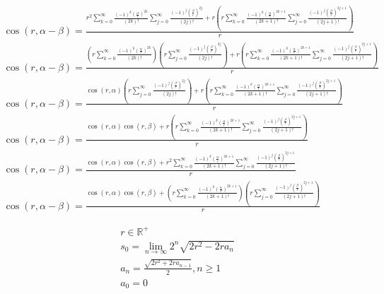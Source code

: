 \documentclass[a4paper,12pt]{report}
\begin{document}
\begin{landscape}
{\begin{gather}
\cos(r,\alpha - \beta) = \frac{r^2 \sum \limits_{k=0}^{\infty} \frac{(-1)^k \left(\frac{\alpha}{r}\right)^{2k}}{(2k)!} \sum \limits_{j=0}^{\infty} \frac{(-1)^j \left(\frac{\beta}{r}\right)^{2j}}{(2j)!} + r \left(r \sum \limits_{k=0}^{\infty} \frac{(-1)^k \left(\frac{\alpha}{r}\right)^{2k+1}}{(2k+1)!} \sum \limits_{j=0}^{\infty} \frac{(-1)^j \left(\frac{\beta}{r}\right)^{2j+1}}{(2j+1)!}\right)}{r} \\
\cos(r,\alpha - \beta) = \frac{\left(r \sum \limits_{k=0}^{\infty} \frac{(-1)^k \left(\frac{\alpha}{r}\right)^{2k}}{(2k)!}\right) \left(r \sum \limits_{j=0}^{\infty} \frac{(-1)^j \left(\frac{\beta}{r}\right)^{2j}}{(2j)!}\right) + r \left(r \sum \limits_{k=0}^{\infty} \frac{(-1)^k \left(\frac{\alpha}{r}\right)^{2k+1}}{(2k+1)!} \sum \limits_{j=0}^{\infty} \frac{(-1)^j \left(\frac{\beta}{r}\right)^{2j+1}}{(2j+1)!}\right)}{r} \\
\cos(r,\alpha - \beta) = \frac{\cos(r,\alpha) \left(r \sum \limits_{j=0}^{\infty} \frac{(-1)^j \left(\frac{\beta}{r}\right)^{2j}}{(2j)!}\right) + r \left(r \sum \limits_{k=0}^{\infty} \frac{(-1)^k \left(\frac{\alpha}{r}\right)^{2k+1}}{(2k+1)!} \sum \limits_{j=0}^{\infty} \frac{(-1)^j \left(\frac{\beta}{r}\right)^{2j+1}}{(2j+1)!}\right)}{r} \\
\cos(r,\alpha - \beta) = \frac{\cos(r,\alpha) \cos(r,\beta) + r \left(r \sum \limits_{k=0}^{\infty} \frac{(-1)^k \left(\frac{\alpha}{r}\right)^{2k+1}}{(2k+1)!} \sum \limits_{j=0}^{\infty} \frac{(-1)^j \left(\frac{\beta}{r}\right)^{2j+1}}{(2j+1)!}\right)}{r} \\
\cos(r,\alpha - \beta) = \frac{\cos(r,\alpha) \cos(r,\beta) + r^2 \sum \limits_{k=0}^{\infty} \frac{(-1)^k \left(\frac{\alpha}{r}\right)^{2k+1}}{(2k+1)!} \sum \limits_{j=0}^{\infty} \frac{(-1)^j \left(\frac{\beta}{r}\right)^{2j+1}}{(2j+1)!}}{r} \\
\cos(r,\alpha - \beta) = \frac{\cos(r,\alpha) \cos(r,\beta) + \left(r \sum \limits_{k=0}^{\infty} \frac{(-1)^k \left(\frac{\alpha}{r}\right)^{2k+1}}{(2k+1)!}\right) \left(r \sum \limits_{j=0}^{\infty} \frac{(-1)^j \left(\frac{\beta}{r}\right)^{2j+1}}{(2j+1)!}\right)}{r} \label{eq:cos_subtraction_formula}
\end{gather}
}
\end{landscape}
\begin{subequations}
\begin{gather}
r \in \mathbb{R}^+ \\
s_0 = \lim \limits_{n \to \infty} 2^n \sqrt{2r^2 - 2ra_n} \\
a_n = \frac{\sqrt{2r^2 + 2ra_{n-1}}}{2}, n \geq 1 \\
a_0 = 0
\end{gather}
\end{subequations}
\end{document}
